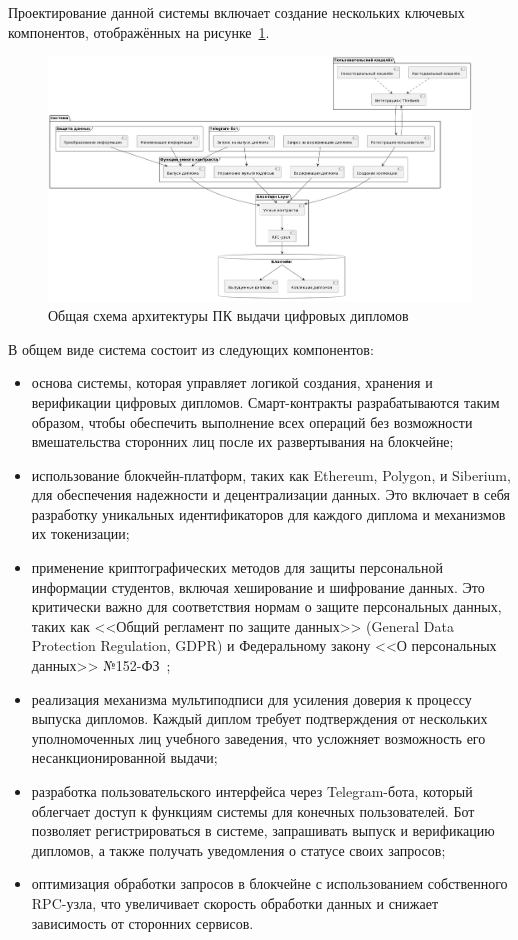 Проектирование данной системы включает создание нескольких ключевых компонентов, отображённых на рисунке~\ref{fig:sys_arch}.

\begin{figure}[H]
	\centering
	\includegraphics[width=\textwidth]{images/sys_arch.png}
	\parskip=6pt
	\caption{Общая схема архитектуры ПК выдачи цифровых дипломов}
	\label{fig:sys_arch}
\end{figure}

В общем виде система состоит из следующих компонентов:

\begin{itemize}
    \item основа системы, которая управляет логикой создания, хранения и верификации цифровых дипломов. Смарт-контракты разрабатываются таким образом, чтобы обеспечить выполнение всех операций без возможности вмешательства сторонних лиц после их развертывания на блокчейне;
    \item использование блокчейн-платформ, таких как Ethereum, Polygon, и Siberium, для обеспечения надежности и децентрализации данных. Это включает в себя разработку уникальных идентификаторов для каждого диплома и механизмов их токенизации;
    \item применение криптографических методов для защиты персональной информации студентов, включая хеширование и шифрование данных. Это критически важно для соответствия нормам о защите персональных данных, таких как <<Общий регламент по защите данных>> (General Data Protection Regulation, GDPR) и Федеральному закону <<О персональных данных>> №152-ФЗ~\cite{bib:152fz};
    \item реализация механизма мультиподписи для усиления доверия к процессу выпуска дипломов. Каждый диплом требует подтверждения от нескольких уполномоченных лиц учебного заведения, что усложняет возможность его несанкционированной выдачи;
    \item разработка пользовательского интерфейса через Telegram-бота, который облегчает доступ к функциям системы для конечных пользователей. Бот позволяет регистрироваться в системе, запрашивать выпуск и верификацию дипломов, а также получать уведомления о статусе своих запросов;
    \item оптимизация обработки запросов в блокчейне с использованием собственного RPC-узла, что увеличивает скорость обработки данных и снижает зависимость от сторонних сервисов.
\end{itemize}

